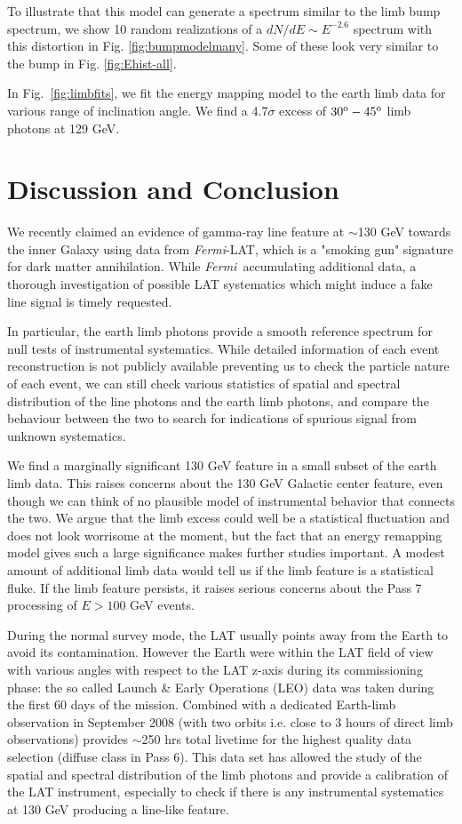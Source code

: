 \documentclass[aps,twocolumn,prd,superscriptaddress,showpacs,nofootinbib,fixfloat]{revtex4}
\newcommand{\Fermi}{{\slshape Fermi}}
\newcommand{\degree}{^{\rm o}}
\begin{document}
To illustrate that this model can generate a spectrum
similar to the limb bump spectrum, we show 10 random
realizations of a $dN/dE \sim E^{-2.6}$ spectrum with this
distortion in Fig. \ref{fig:bumpmodelmany}.  Some of these
look very similar to the bump in
Fig. \ref{fig:Ehist-all}. 

In Fig.~\ref{fig:limbfits}, we fit the energy mapping model
to the earth limb data for various range of inclination
angle. We find a 4.7$\sigma$ excess of $30\degree-45\degree$
limb photons at 129 GeV.


\section{Discussion and Conclusion}

We recently claimed an evidence of gamma-ray line feature at
$\sim$130 GeV towards the inner Galaxy using data from
\Fermi-LAT, which is a "smoking gun" signature for dark
matter annihilation. While \Fermi\ accumulating additional
data, a thorough investigation of possible LAT systematics
which might induce a fake line signal is timely requested.

In particular, the earth limb photons provide a smooth
reference spectrum for null tests of instrumental
systematics. While detailed information of each event
reconstruction is not publicly available preventing us to
check the particle nature of each event, we can still check
various statistics of spatial and spectral distribution of
the line photons and the earth limb photons, and compare the
behaviour between the two to search for indications of
spurious signal from unknown systematics. 

We find a marginally significant 130 GeV feature in a small
subset of the earth limb data.  This raises concerns about
the 130 GeV Galactic center feature, even though we can
think of no plausible model of instrumental behavior that
connects the two.  We argue that the limb excess could well
be a statistical fluctuation and does not look worrisome at
the moment, but the fact that an energy remapping model
gives such a large significance makes further studies
important. A modest amount of additional limb data
would tell us if the limb feature is a statistical fluke.
If the limb feature persists, it raises serious concerns
about the Pass 7 processing of $E > 100$ GeV events. 



During the normal survey mode, the LAT usually points away
from the Earth to avoid its contamination. However the Earth
were within the LAT field of view with various angles with
respect to the LAT z-axis during its commissioning phase:
the so called Launch \& Early Operations (LEO) data was
taken during the first 60 days of the mission. Combined with
a dedicated Earth-limb observation in September 2008 (with
two orbits i.e. close to 3 hours of direct limb
observations) provides $\sim$250 hrs total livetime for the
highest quality data selection (diffuse class in Pass
6)\cite{FermiLimb}. This data set has allowed the study of
the spatial and spectral distribution of the limb photons
and provide a calibration of the LAT instrument, especially
to check if there is any instrumental systematics at 130 GeV
producing a line-like feature.
\end{document}
